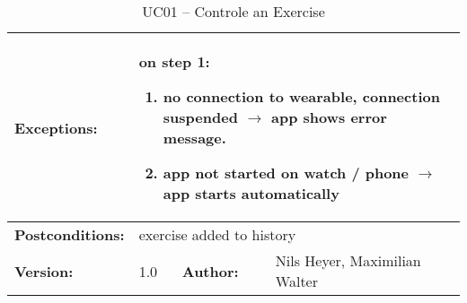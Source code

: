 \begin{table}[H]
\begin{tabular}{|l|l|l|l|l|l|}
		\textbf{Exceptions:} & \multicolumn{5}{l|}{\parbox{0.75\textwidth}{
			$ $\\on step 1:
			\begin{enumerate}[itemsep=-5]
				\item no connection to wearable, connection suspended $\rightarrow$ app shows error message.
				\item app not started on watch / phone $\rightarrow$ app starts automatically
			\end{enumerate}
		}} \\ \hline
		\textbf{Postconditions:} & \multicolumn{5}{l|}{exercise added to history} \\ \hline
		\textbf{Version:} & \multicolumn{2}{l|}{1.0} & \textbf{Author:} & \multicolumn{2}{l|}{Nils Heyer, Maximilian Walter} \\ \hline
	\end{tabular}
	\caption{UC01 -- Controle an Exercise}
\end{table}

